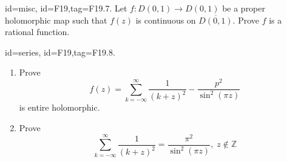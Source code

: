 \documentclass[12pt,letterpaper]{article}
\theoremstyle{plain}
\theoremstyle{definition}
\begin{document}
{\item[id=misc, id=F19,tag=F19.7.]
Let $f : D(0,1) \rightarrow D(0,1)$ be a proper holomorphic map such that $f(z)$ is continuous on $\overline{D(0,1)}$. Prove $f$ is a rational function.


\item[id=series, id=F19,tag=F19.8.]
\begin{enumerate}[label=(\alph*)]\onlyitems
\item Prove
\[
	f(z) = \sum_{k=-\infty}^{\infty} \frac{1}{(k+z)^2} - \frac{p^2}{\sin^2(\pi z)}
\]
is entire holomorphic.
\item Prove
\[
	\sum_{k=-\infty}^{\infty} \frac{1}{(k+z)^2} = \frac{\pi^2}{\sin^2(\pi z)}, \; z \notin \mathbb{Z}
\]
\end{enumerate}

}
\end{document}

